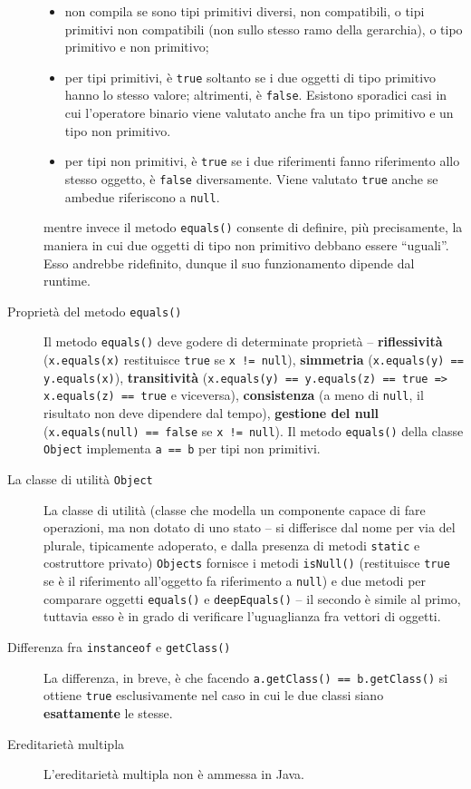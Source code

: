 \documentclass[\fontsizeclass,twocolumn]{\classname}
\theoremstyle{definition}
\theoremstyle{definition}
\begin{document}
\begin{description}
\begin{itemize}
            \item non compila se sono tipi primitivi diversi, non compatibili, o tipi
                primitivi non compatibili (non sullo stesso ramo della gerarchia), o
                tipo primitivo e non primitivo;
            \item per tipi primitivi, è \texttt{true} soltanto se i due oggetti di tipo
                primitivo hanno lo stesso valore; altrimenti, è \texttt{false}.
                Esistono sporadici casi in cui l'operatore binario viene valutato anche
                fra un tipo primitivo e un tipo non primitivo.
            \item per tipi non primitivi, è \texttt{true} se i due riferimenti fanno
                riferimento allo stesso oggetto, è \texttt{false} diversamente. Viene
                valutato \texttt{true} anche se ambedue riferiscono a \texttt{null}.
        \end{itemize}
        mentre invece il metodo \texttt{equals()} consente di definire, più
        precisamente, la maniera in cui due oggetti di tipo non primitivo
        debbano essere ``uguali''. Esso andrebbe ridefinito, dunque il suo
        funzionamento dipende dal runtime.
    \item[Proprietà del metodo \texttt{equals()}] Il metodo \texttt{equals()}
        deve godere di determinate proprietà -- \textbf{riflessività}
        (\texttt{x.equals(x)} restituisce \texttt{true} se \texttt{x != null}),
        \textbf{simmetria} (\texttt{x.equals(y) == y.equals(x)}),
        \textbf{transitività} (\texttt{x.equals(y) == y.equals(z) == true =>
        x.equals(z) == true} e viceversa), \textbf{consistenza} (a meno di
        \texttt{null}, il risultato non deve dipendere dal tempo),
        \textbf{gestione del null} (\texttt{x.equals(null) == false} se
        \texttt{x != null}). Il metodo \texttt{equals()} della classe
        \texttt{Object} implementa \texttt{a == b} per tipi non primitivi.
    \item[La classe di utilità \texttt{Object}] La classe di utilità (classe
        che modella un componente capace di fare operazioni, ma non dotato di
        uno stato -- si differisce dal nome per via del plurale, tipicamente
        adoperato, e dalla presenza di metodi \texttt{static} e costruttore
        privato) \texttt{Objects} fornisce i metodi \texttt{isNull()}
        (restituisce \texttt{true} se è il riferimento all'oggetto fa
        riferimento a \texttt{null}) e due metodi per comparare oggetti
        \texttt{equals()} e \texttt{deepEquals()} -- il secondo è simile al
        primo, tuttavia esso è in grado di verificare l'uguaglianza fra
        vettori di oggetti.
    \item[Differenza fra \texttt{instanceof} e \texttt{getClass()}] La
        differenza, in breve, è che facendo \texttt{a.getClass() ==
        b.getClass()} si ottiene \texttt{true} esclusivamente nel caso in cui
        le due classi siano \textbf{esattamente} le stesse.
    \item[Ereditarietà multipla] L'ereditarietà multipla non è ammessa in Java.
\end{description}
\end{document}
